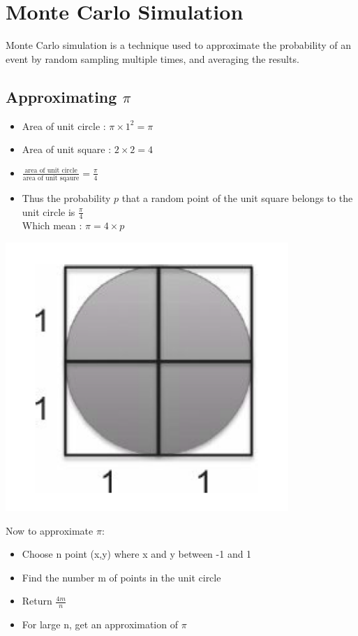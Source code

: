 \documentclass[12pt,oneside]{book}
\begin{document}
\section{Monte Carlo Simulation}
Monte Carlo simulation is a technique used to approximate the probability of an event by random sampling multiple times, and averaging the results.
\subsection{Approximating $\pi$}

\begin{minipage}{0.7\linewidth}
	\begin{itemize}
		\item Area of unit circle : $\pi \times 1^2 = \pi$
		\item Area of unit square : $2\times 2 = 4$
		\item $\frac{\text{area of unit circle}}{\text{area of unit sqaure}} = \frac{\pi}{4}$
		\item Thus the probability $p$ that a random point of the unit square belongs to the unit circle is $\frac{\pi}{4}$\\
		      Which mean : $\boxed{\pi = 4\times p}$
	\end{itemize}
\end{minipage}
\begin{minipage}{0.3\linewidth}
	\includegraphics[width=\linewidth]{../pic/python/1.png}
\end{minipage}
Now to approximate $\pi$:
\begin{itemize}
	\item Choose n point (x,y) where x and y between -1 and 1
	\item Find the number m of points in the unit circle
	\item Return $\frac{4m}{n}$
	\item For large n, get an approximation of $\pi$
\end{itemize}
\end{document}
